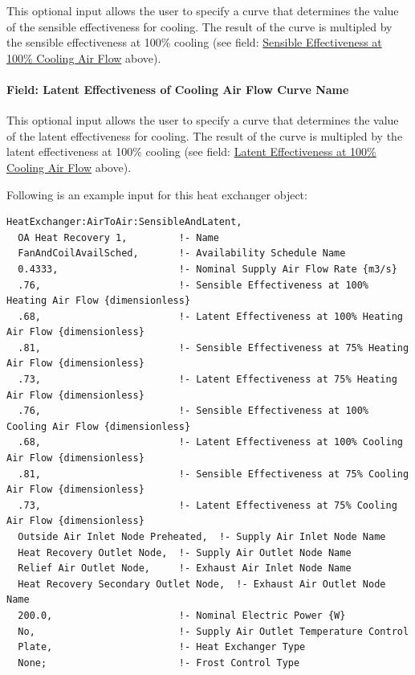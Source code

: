 This optional input allows the user to specify a curve that determines the value of the sensible effectiveness for cooling.  The result of the curve is multipled by the sensible effectiveness at 100\% cooling (see field: \hyperref[field-sensible-effectiveness-at-100-cooling-air-flow]{Sensible Effectiveness at 100\% Cooling Air Flow} above).

\paragraph{Field: Latent Effectiveness of Cooling Air Flow Curve Name}\label{field-latent-effectiveness-of-cooling-air-flow-curve-name-1}

This optional input allows the user to specify a curve that determines the value of the latent effectiveness for cooling.  The result of the curve is multipled by the latent effectiveness at 100\% cooling (see field: \hyperref[field-latent-effectiveness-at-100-cooling-air-flow]{Latent Effectiveness at 100\% Cooling Air Flow} above).

Following is an example input for this heat exchanger object:

\begin{lstlisting}
HeatExchanger:AirToAir:SensibleAndLatent,
  OA Heat Recovery 1,         !- Name
  FanAndCoilAvailSched,       !- Availability Schedule Name
  0.4333,                     !- Nominal Supply Air Flow Rate {m3/s}
  .76,                        !- Sensible Effectiveness at 100% Heating Air Flow {dimensionless}
  .68,                        !- Latent Effectiveness at 100% Heating Air Flow {dimensionless}
  .81,                        !- Sensible Effectiveness at 75% Heating Air Flow {dimensionless}
  .73,                        !- Latent Effectiveness at 75% Heating Air Flow {dimensionless}
  .76,                        !- Sensible Effectiveness at 100% Cooling Air Flow {dimensionless}
  .68,                        !- Latent Effectiveness at 100% Cooling Air Flow {dimensionless}
  .81,                        !- Sensible Effectiveness at 75% Cooling Air Flow {dimensionless}
  .73,                        !- Latent Effectiveness at 75% Cooling Air Flow {dimensionless}
  Outside Air Inlet Node Preheated,  !- Supply Air Inlet Node Name
  Heat Recovery Outlet Node,  !- Supply Air Outlet Node Name
  Relief Air Outlet Node,     !- Exhaust Air Inlet Node Name
  Heat Recovery Secondary Outlet Node,  !- Exhaust Air Outlet Node Name
  200.0,                      !- Nominal Electric Power {W}
  No,                         !- Supply Air Outlet Temperature Control
  Plate,                      !- Heat Exchanger Type
  None;                       !- Frost Control Type
\end{lstlisting}

